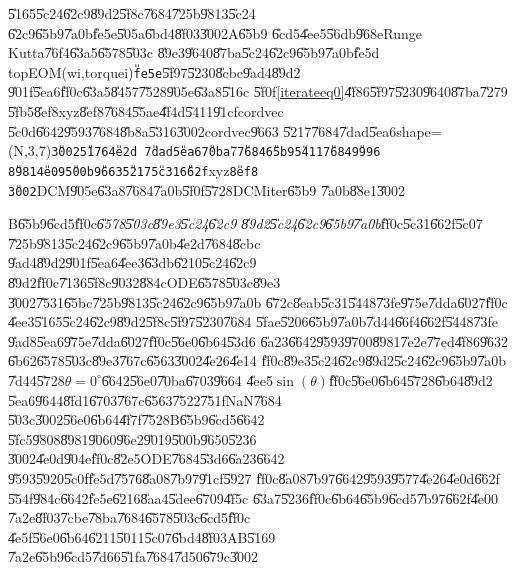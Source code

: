 \documentclass[12pt,a4paper]{article}
\begin{document}
\U{5165}\U{5c24}\U{62c9}\U{89d2}\U{5f8c}\U{7684}\U{725b}\U{9813}\U{5c24}%
\U{62c9}\U{65b9}\U{7a0b}\U{fe5e}\U{505a}\U{6bd4}\U{8f03}\U{3002}A\U{65b9}%
\U{6cd5}\U{4ee5}\U{56db}\U{968e}Runge Kutta\U{76f4}\U{63a5}\U{6578}\U{503c}%
\U{89e3}\U{9640}\U{87ba}\U{5c24}\U{62c9}\U{65b9}\U{7a0b}\U{fe5d}%
topEOM(wi,torquei)\texttt{\U{fe5e}}\U{5f97}\U{5230}\U{8cbc}\U{9ad4}\U{89d2}%
\U{901f}\U{5ea6}\U{ff0c}\U{63a5}\U{8457}\U{7528}\U{905e}\U{63a8}\U{516c}%
\U{5f0f}\ref{iterateeq0}\U{4f86}\U{5f97}\U{5230}\U{9640}\U{87ba}\U{7279}%
\U{5fb5}\U{8ef8}xyz\U{8ef8}\U{7684}\U{55ae}\U{4f4d}\U{5411}\U{91cf}cordvec%
\U{5c0d}\U{6642}\U{9593}\U{7684}\U{8b8a}\U{5316}\U{3002}cordvec\U{9663}%
\U{5217}\U{7684}\U{7dad}\U{5ea6}shape=(N,3,7)\texttt{\U{3002}\U{5176}\U{4e2d}%
\U{7dad}\U{5ea6}\U{70ba}}7\texttt{\U{7684}\U{65b9}\U{5411}\U{7684}\U{9996}%
\U{8981}\U{4e09}\U{500b}\U{9663}\U{5217}\U{5c31}\U{662f}}xyz\texttt{\U{8ef8}%
\U{3002}}DCM\U{905e}\U{63a8}\U{7684}\U{7a0b}\U{5f0f}\U{5728}DCMiter\U{65b9}%
\U{7a0b}\U{88e1}\U{3002}

\bigskip

B\U{65b9}\U{6cd5}\U{ff0c}\emph{\U{6578}\U{503c}\U{89e3}\U{5c24}\U{62c9}%
\U{89d2}\U{5c24}\U{62c9}\U{65b9}\U{7a0b}}\U{ff0c}\U{5c31}\U{662f}\U{5c07}%
\U{725b}\U{9813}\U{5c24}\U{62c9}\U{65b9}\U{7a0b}\U{4e2d}\U{7684}\U{8cbc}%
\U{9ad4}\U{89d2}\U{901f}\U{5ea6}\U{4ee3}\U{63db}\U{6210}\U{5c24}\U{62c9}%
\U{89d2}\U{ff0c}\U{7136}\U{5f8c}\U{9032}\U{884c}ODE\U{6578}\U{503c}\U{89e3}%
\U{3002}\U{7531}\U{65bc}\U{725b}\U{9813}\U{5c24}\U{62c9}\U{65b9}\U{7a0b}%
\U{672c}\U{8eab}\U{5c31}\U{5448}\U{73fe}\U{975e}\U{7dda}\U{6027}\U{ff0c}%
\U{4ee3}\U{5165}\U{5c24}\U{62c9}\U{89d2}\U{5f8c}\U{5f97}\U{5230}\U{7684}%
\U{5fae}\U{5206}\U{65b9}\U{7a0b}\U{7d44}\U{66f4}\U{662f}\U{5448}\U{73fe}%
\U{9ad8}\U{5ea6}\U{975e}\U{7dda}\U{6027}\U{ff0c}\U{56e0}\U{6b64}\U{53d6}%
\U{6a23}\U{6642}\U{9593}\U{9700}\U{8981}\U{7e2e}\U{77ed}\U{4f86}\U{9632}%
\U{6b62}\U{6578}\U{503c}\U{89e3}\U{767c}\U{6563}\U{3002}\U{4e26}\U{4e14}%
\U{ff0c}\U{89e3}\U{5c24}\U{62c9}\U{89d2}\U{5c24}\U{62c9}\U{65b9}\U{7a0b}%
\U{7d44}\U{5728}$\theta =0^{\circ }$\U{6642}\U{56e0}\U{70ba}\U{6703}\U{9664}%
\U{4ee5}$\sin (\theta )$\U{ff0c}\U{56e0}\U{6b64}\U{5728}\U{6b64}\U{89d2}%
\U{5ea6}\U{9644}\U{8fd1}\U{6703}\U{767c}\U{6563}\U{7522}\U{751f}NaN\U{7684}%
\U{503c}\U{3002}\U{56e0}\U{6b64}\U{4f7f}\U{7528}B\U{65b9}\U{6cd5}\U{6642}%
\U{5fc5}\U{9808}\U{8981}\U{9060}\U{96e2}\U{9019}\U{500b}\U{9650}\U{5236}%
\U{3002}\U{4e0d}\U{904e}\U{ff0c}\U{82e5}ODE\U{7684}\U{53d6}\U{6a23}\U{6642}%
\U{9593}\U{5920}\U{5c0f}\U{fe5d}\U{7576}\U{8a08}\U{7b97}\U{91cf}\U{5927}%
\U{ff0c}\U{8a08}\U{7b97}\U{6642}\U{9593}\U{9577}\U{4e26}\U{4e0d}\U{662f}%
\U{554f}\U{984c}\U{6642}\U{fe5e}\U{6216}\U{8aa4}\U{5dee}\U{6709}\U{4f5c}%
\U{63a7}\U{5236}\U{ff0c}\U{6b64}\U{65b9}\U{6cd5}\U{7b97}\U{662f}\U{4e00}%
\U{7a2e}\U{8f03}\U{7cbe}\U{78ba}\U{7684}\U{6578}\U{503c}\U{6cd5}\U{ff0c}%
\U{4e5f}\U{56e0}\U{6b64}\U{6211}\U{5011}\U{5c07}\U{6bd4}\U{8f03}AB\U{5169}%
\U{7a2e}\U{65b9}\U{6cd5}\U{7d66}\U{51fa}\U{7684}\U{7d50}\U{679c}\U{3002}
\end{document}
